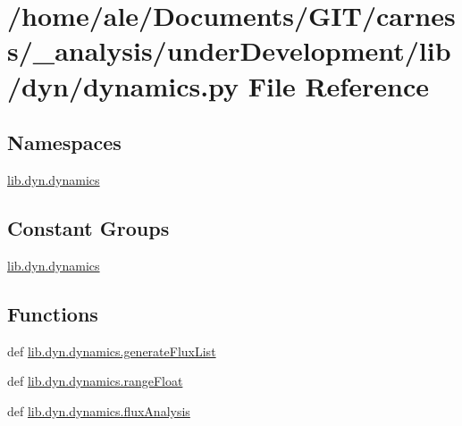 \hypertarget{a00047}{\section{/home/ale/\-Documents/\-G\-I\-T/carness/\-\_\-analysis/under\-Development/lib/dyn/dynamics.py File Reference}
\label{a00047}
}
\subsection*{Namespaces}
\begin{DoxyCompactItemize}
\item 
\hyperlink{a00104}{lib.\-dyn.\-dynamics}
\end{DoxyCompactItemize}
\subsection*{Constant Groups}
\begin{DoxyCompactItemize}
\item 
\hyperlink{a00104}{lib.\-dyn.\-dynamics}
\end{DoxyCompactItemize}
\subsection*{Functions}
\begin{DoxyCompactItemize}
\item 
def \hyperlink{a00104_a5c7482c3127ef70514cbc82ce1aa9f47}{lib.\-dyn.\-dynamics.\-generate\-Flux\-List}
\item 
def \hyperlink{a00104_acbc0de876640b8d5355bf6a0e4fdef4a}{lib.\-dyn.\-dynamics.\-range\-Float}
\item 
def \hyperlink{a00104_ac3232f52dce6e169a93eba81f8fb926e}{lib.\-dyn.\-dynamics.\-flux\-Analysis}
\end{DoxyCompactItemize}
